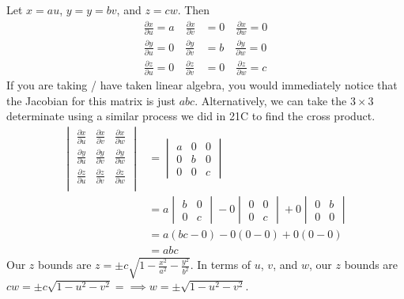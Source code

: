 \documentclass{article}
\begin{document}
Let $x=au$, $y=y=bv$, and $z=cw$. Then
\begin{align*}
    \frac{\partial x}{\partial u}=a\hspace{1em}\frac{\partial x}{\partial v}&= 0\hspace{1em}\frac{\partial x}{\partial w}=0\\
    \frac{\partial y}{\partial u}=0\hspace{1em}\frac{\partial y}{\partial v}&= b\hspace{1em}\frac{\partial y}{\partial w}=0\\
    \frac{\partial z}{\partial u}=0\hspace{1em}\frac{\partial z}{\partial v}&= 0\hspace{1em}\frac{\partial z}{\partial w}=c
\end{align*}
If you are taking / have taken linear algebra, you would immediately notice that the Jacobian for this matrix is just $abc$. Alternatively, we can take the $3\times3$ determinate using a similar process we did in 21C to find the cross product.
\begin{align*}
    \begin{vmatrix}
      \frac{\partial x}{\partial u} & \frac{\partial x}{\partial v} &
      \frac{\partial x}{\partial w}\\
      \frac{\partial y}{\partial u} & \frac{\partial y}{\partial v} &
      \frac{\partial y}{\partial w}\\
      \frac{\partial z}{\partial u} & \frac{\partial z}{\partial v} &
      \frac{\partial z}{\partial w}\\
    \end{vmatrix}&=
\begin{vmatrix}
  a & 0 & 0 \\
  0 & b & 0\\
  0 & 0 & c
\end{vmatrix}\\
&= a\begin{vmatrix}
  b & 0\\
  0 & c
\end{vmatrix}- 0\begin{vmatrix}
  0 & 0\\
  0 & c
\end{vmatrix}+0\begin{vmatrix}
  0 & b\\
  0 & 0
\end{vmatrix}\\
&= a(bc - 0) - 0(0 - 0) + 0(0 - 0)\\
&=abc
\end{align*}
Our $z$ bounds are $z=\pm c\sqrt{1- \frac{x^2}{a^2}-\frac{y^2}{b^2}}$. In terms of $u$, $v$, and $w$, our $z$ bounds are $cw=\pm c \sqrt{1- u^2 - v^2}=\implies w = \pm \sqrt{1-u^2-v^2}$.
\end{document}
